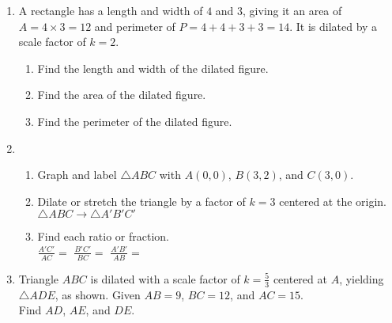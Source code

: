 \begin{enumerate}
\item A rectangle has a length and width of $4$ and $3$, giving it an area of $A=4 \times 3 = 12$ and perimeter of $P=4+4+3+3=14$. It is dilated by a scale factor of $k=2$.
  \begin{enumerate}[itemsep=1cm]
    \item Find the length and width of the dilated figure.
    \item Find the area of the dilated figure.
    \item Find the perimeter of the dilated figure.
  \end{enumerate}

\newpage
\item \begin{enumerate}
  \item Graph and label $\triangle ABC$ with $A(0,0)$, $B(3,2)$, and $C(3,0)$.
  \begin{center}
  \end{center}
  \item Dilate or stretch the triangle by a factor of $k=3$ centered at the origin.\\ $\triangle ABC \rightarrow \triangle A'B'C'$
  \item Find each ratio or fraction. \\[0.5cm]
    $\displaystyle \frac{A'C'}{AC}=$ \hfill
    $\displaystyle \frac{B'C'}{BC}=$ \hfill
    $\displaystyle \frac{A'B'}{AB}=$ \hspace{2cm}
\vspace{1cm}
\end{enumerate}
\item Triangle $ABC$ is dilated with a scale factor of $k=\frac{5}{3}$ centered at $A$, yielding $\triangle ADE$, as shown. Given $AB=9$, $BC=12$, and $AC=15$. \\[0.25cm] Find $AD$, $AE$, and $DE$. \vspace{0.5cm}
   \begin{center}
     \end{center}


\end{enumerate}
